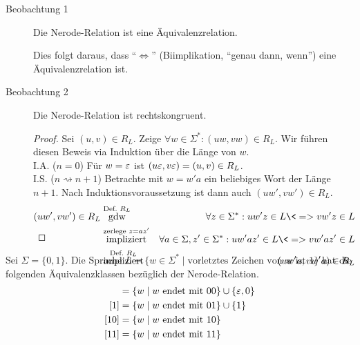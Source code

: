 \begin{description}
 \item[Beobachtung 1] Die Nerode-Relation ist eine Äquivalenzrelation.
 
 Dies folgt daraus, dass "`$\Leftrightarrow$"' (Biimplikation, "`genau dann, wenn"') eine Äquivalenzrelation ist.
 \item[Beobachtung 2] Die Nerode-Relation ist rechtskongruent.
                \begin{proof}
                Sei $(u,v)\in R_L$. Zeige $\forall w\in\Sigma^*: (uw,vw)\in R_L$.
                Wir führen diesen Beweis via Induktion über die Länge von $w$.\\
                I.A. ($n=0$) Für $w=\varepsilon$ ist $ (u\varepsilon,v\varepsilon)=(u,v)\in R_L$.\\
                I.S. ($n\rightsquigarrow n+1$) Betrachte mit $w=w'a$ ein beliebiges Wort der Länge $n+1$.
                Nach Induktionsvoraussetzung ist dann auch $(uw', vw') \in R_L $.
                \begin{eqnarray*}
		(uw',vw')\in R_L 
		& \stackrel{\text{Def.\ } R_L}{\text{gdw}} & \forall z\in\Sigma^*: uw'z\in L \<=> vw'z\in L\\
		& \stackrel{\text{zerlege } z=az'}{\text{impliziert}} & \forall a\in \Sigma, z'\in\Sigma^*: uw'az'\in L \<=> vw'az'\in L\\
		& \stackrel{\text{Def.\ } R_L}{\text{impliziert}} & (uw'a,vw'a)\in R_L
		\qedherefixeqnarray
	      \end{eqnarray*}
              \end{proof}
\end{description}

\begin{Bsp}
Sei $\Sigma=\{0,1\}$. Die Sprache $L=\{w\in\Sigma^*\mid \text{vorletztes Zeichen von $w$ ist } 1\}$ hat die folgenden Äquivalenzklassen bezüglich der Nerode-Relation.
        \begin{align*}
        [\Eps] &= \{w\mid w \text{ endet mit } 00 \} \cup \{\varepsilon, 0\}\\
        [1] &= \{w\mid w \text{ endet mit } 01 \} \cup \{1\}\\
        [10] &= \{w\mid w \text{ endet mit } 10 \}\\
        [11] &= \{w\mid w \text{ endet mit } 11 \}
        \qedhere
        \end{align*}
\end{Bsp}

